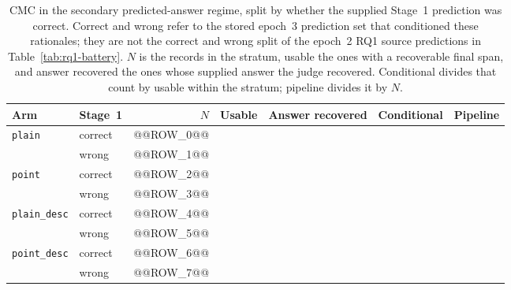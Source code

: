 \begin{table}[ht]
\centering
\caption[Predicted-answer CMC by Stage~1 correctness]{CMC in the secondary
predicted-answer regime, split by whether the supplied Stage~1 prediction was
correct. Correct and wrong refer to the stored epoch~3 prediction set that
conditioned these rationales; they are not the correct and wrong split of the
epoch~2 RQ1 source predictions in Table~\ref{tab:rq1-battery}. $N$ is the
records in the stratum, usable the ones with a recoverable final span, and
answer recovered the ones whose supplied answer the judge recovered. Conditional
divides that count by usable within the stratum; pipeline divides it by $N$.}
\label{tab:app-pred-a-strata}
\begin{tabular}{llrrrrr}
\toprule
Arm & Stage~1 & $N$ & Usable & Answer recovered & Conditional & Pipeline \\
\midrule
\texttt{plain} & correct & @@ROW_0@@ \\
 & wrong & @@ROW_1@@ \\
\addlinespace
\texttt{point} & correct & @@ROW_2@@ \\
 & wrong & @@ROW_3@@ \\
\addlinespace
\texttt{plain\_desc} & correct & @@ROW_4@@ \\
 & wrong & @@ROW_5@@ \\
\addlinespace
\texttt{point\_desc} & correct & @@ROW_6@@ \\
 & wrong & @@ROW_7@@ \\
\bottomrule
\end{tabular}
\end{table}
